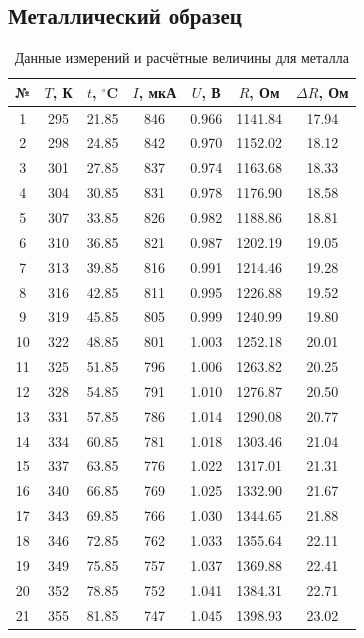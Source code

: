\documentclass[a4paper,14pt]{article}
\begin{document}
\subsection{Металлический образец}

\begin{table}[H]
\centering
\caption{Данные измерений и расчётные величины для металла}
\label{tab:metal}
\small
\begin{tabular}{|c|c|c|c|c|c|c|}
\hline
№ & $T$, К & $t$, $^{\circ}$C & $I$, мкА & $U$, В & $R$, Ом & $\Delta R$, Ом \\
\hline
1  & 295 & 21.85 & 846 & 0.966 & 1141.84 & 17.94 \\
2  & 298 & 24.85 & 842 & 0.970 & 1152.02 & 18.12 \\
3  & 301 & 27.85 & 837 & 0.974 & 1163.68 & 18.33 \\
4  & 304 & 30.85 & 831 & 0.978 & 1176.90 & 18.58 \\
5  & 307 & 33.85 & 826 & 0.982 & 1188.86 & 18.81 \\
6  & 310 & 36.85 & 821 & 0.987 & 1202.19 & 19.05 \\
7  & 313 & 39.85 & 816 & 0.991 & 1214.46 & 19.28 \\
8  & 316 & 42.85 & 811 & 0.995 & 1226.88 & 19.52 \\
9  & 319 & 45.85 & 805 & 0.999 & 1240.99 & 19.80 \\
10 & 322 & 48.85 & 801 & 1.003 & 1252.18 & 20.01 \\
11 & 325 & 51.85 & 796 & 1.006 & 1263.82 & 20.25 \\
12 & 328 & 54.85 & 791 & 1.010 & 1276.87 & 20.50 \\
13 & 331 & 57.85 & 786 & 1.014 & 1290.08 & 20.77 \\
14 & 334 & 60.85 & 781 & 1.018 & 1303.46 & 21.04 \\
15 & 337 & 63.85 & 776 & 1.022 & 1317.01 & 21.31 \\
16 & 340 & 66.85 & 769 & 1.025 & 1332.90 & 21.67 \\
17 & 343 & 69.85 & 766 & 1.030 & 1344.65 & 21.88 \\
18 & 346 & 72.85 & 762 & 1.033 & 1355.64 & 22.11 \\
19 & 349 & 75.85 & 757 & 1.037 & 1369.88 & 22.41 \\
20 & 352 & 78.85 & 752 & 1.041 & 1384.31 & 22.71 \\
21 & 355 & 81.85 & 747 & 1.045 & 1398.93 & 23.02 \\
\hline
\end{tabular}
\end{table}
\end{document}
